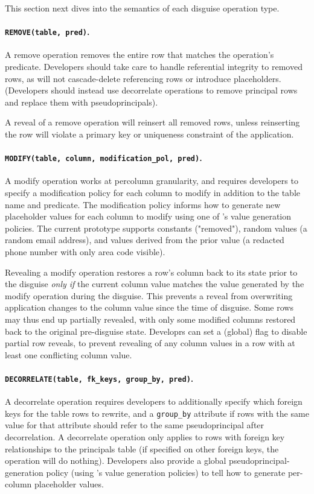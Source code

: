 This section next dives into the semantics of each disguise operation type.
%

\paragraph{\texttt{REMOVE(table, pred)}.}
A remove operation removes the entire row that matches the operation's
predicate.
%
Developers should take care to handle referential integrity to removed rows, as
\sys will not cascade-delete referencing rows or introduce placeholders.
(Developers should instead use decorrelate operations to remove principal rows
and replace them with pseudoprincipals).
%

%
A reveal of a remove operation will reinsert all removed rows, unless
reinserting the row will violate a primary key or uniqueness constraint of the
application.
%

%
\paragraph{\texttt{MODIFY(table, column, modification\_pol, pred)}.}
A modify operation works at per\-column granularity, and requires developers to
specify a modification policy for each column to modify in addition to the table
name and predicate.
%
The modification policy informs \sys how to generate new placeholder values for
each column to modify using one of \sys's value generation policies. The current
prototype supports constants (\eg "removed"), random values (\eg a random email
address), and values derived from the prior value (\eg a redacted phone number
with only area code visible).
%

%
Revealing a modify operation restores a row's column back to its state prior
to the disguise \emph{only if} the current column value matches the value
generated by the modify operation during the disguise. This prevents a reveal
from overwriting application changes to the column value since the time of
disguise.
%
Some rows may thus end up partially revealed, with only some modified columns
restored back to the original pre-disguise state.  Developrs can set a (global)
flag to disable partial row reveals, to prevent revealing of any column values
in a row with at least one conflicting column value.
%

%
\paragraph{\texttt{DECORRELATE(table, fk\_keys, group\_by, pred)}.}
%
A decorrelate operation requires developers to additionally specify which
foreign keys for the table rows to rewrite, and a \texttt{group\_by} attribute
if rows with the same value for that attribute should refer to the same
pseudoprincipal after decorrelation.
%
A decorrelate operation only applies to rows with foreign key relationships to
the principals table (if specified on other foreign keys, the operation will do
nothing).
%
Developers also provide a global pseudoprincipal-generation policy (using \sys's
value generation policies) to tell \sys how to generate per-column placeholder
values.
%

